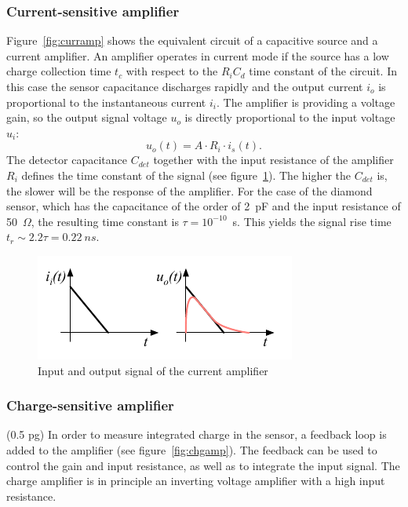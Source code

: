\documentclass[twoside,12pt]{packages/mytustyle}  %
\begin{document}
\subsubsection{Current-sensitive amplifier}
Figure~\ref{fig:curramp} shows the equivalent circuit of a capacitive source and a current amplifier. An amplifier operates in current mode if the source has a low charge collection time $t_c$ with respect to the $R_iC_d$ time constant of the circuit. In this case the sensor capacitance discharges rapidly and the output current $i_o$ is proportional to the instantaneous current $i_i$. The amplifier is providing a voltage gain, so the output signal voltage $u_o$ is directly proportional to the input voltage $u_i$:
\begin{equation}
u_o(t) = A \cdot R_i \cdot i_s(t).
\end{equation}
The detector capacitance $C_{det}$ together with the input resistance of the amplifier $R_i$ defines the time constant of the signal (see figure~\ref{fig:currc}). The higher the $C_{det}$ is, the slower will be the response of the amplifier. For the case of the diamond sensor, which has the capacitance of the order of 2~pF and the input resistance of 50~$\Omega$, the resulting time constant is $\tau=10^{-10}$~s. This yields the signal rise time $t_r\sim2.2\tau=0.22~ns$.
\begin{figure}[!t]
\begin{center}
\includegraphics[width=0.45\linewidth]{plots/currrc}
\caption{Input and output signal of the current amplifier}
\label{fig:currc}
\end{center}
\end{figure}




\subsubsection{Charge-sensitive amplifier}
(0.5 pg)
In order to measure integrated charge in the sensor, a feedback loop is added to the amplifier (see figure~\ref{fig:chgamp}). The feedback can be used to control the gain and input resistance, as well as to integrate the input signal. The charge amplifier is in principle an inverting voltage amplifier with a high input resistance. 
 
\end{document}
